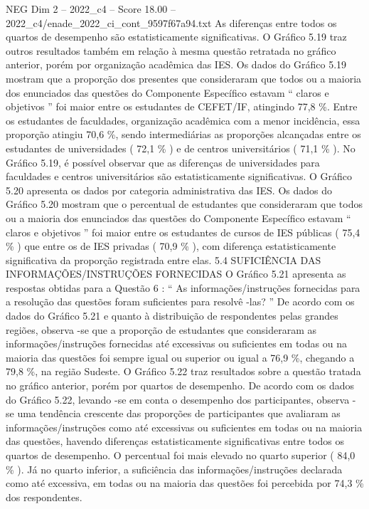 \begin{textsample}{NEG Dim 2 – 2022\_c4 – Score 18.00 – 2022\_c4/enade\_2022\_ci\_cont\_9597f67a94.txt}
As diferenças entre todos os quartos de desempenho são estatisticamente significativas.
O Gráfico 5.19 traz outros resultados também em relação à mesma questão retratada no gráfico anterior, porém por organização acadêmica das IES.
Os dados do Gráfico 5.19 mostram que a proporção dos presentes que consideraram que todos ou a maioria dos enunciados das questões do Componente Específico estavam “ claros e objetivos ” foi maior entre os estudantes de CEFET/IF, atingindo 77,8 \%.
Entre os estudantes de faculdades, organização acadêmica com a menor incidência, essa proporção atingiu 70,6 \%, sendo intermediárias as proporções alcançadas entre os estudantes de universidades ( 72,1 \% ) e de centros universitários ( 71,1 \% ).
No Gráfico 5.19, é possível observar que as diferenças de universidades para faculdades e centros universitários são estatisticamente significativas.
O Gráfico 5.20 apresenta os dados por categoria administrativa das IES.
Os dados do Gráfico 5.20 mostram que o percentual de estudantes que consideraram que todos ou a maioria dos enunciados das questões do Componente Específico estavam “ claros e objetivos ” foi maior entre os estudantes de cursos de IES públicas ( 75,4 \% ) que entre os de IES privadas ( 70,9 \% ), com diferença estatisticamente significativa da proporção registrada entre elas. 5.4 SUFICIÊNCIA DAS INFORMAÇÕES/INSTRUÇÕES FORNECIDAS O Gráfico 5.21 apresenta as respostas obtidas para a Questão 6 : “ As informações/instruções fornecidas para a resolução das questões foram suficientes para resolvê -las? ” De acordo com os dados do Gráfico 5.21 e quanto à distribuição de respondentes pelas grandes regiões, observa -se que a proporção de estudantes que consideraram as informações/instruções fornecidas até excessivas ou suficientes em todas ou na maioria das questões foi sempre igual ou superior ou igual a 76,9 \%, chegando a 79,8 \%, na região Sudeste.
O Gráfico 5.22 traz resultados sobre a questão tratada no gráfico anterior, porém por quartos de desempenho.
De acordo com os dados do Gráfico 5.22, levando -se em conta o desempenho dos participantes, observa -se uma tendência crescente das proporções de participantes que avaliaram as informações/instruções como até excessivas ou suficientes em todas ou na maioria das questões, havendo diferenças estatisticamente significativas entre todos os quartos de desempenho.
O percentual foi mais elevado no quarto superior ( 84,0 \% ).
Já no quarto inferior, a suficiência das informações/instruções declarada como até excessiva, em todas ou na maioria das questões foi percebida por 74,3 \% dos respondentes.

\end{textsample}
